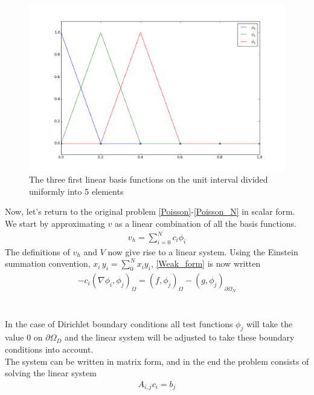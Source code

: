 \begin{figure}
  \begin{center}
    \includegraphics[scale=0.4]{figures/hats.png}
  \end{center}
	\caption{The three first linear basis functions on the unit interval divided uniformly into 5 elements}
	\label{fig:Hats}
\end{figure}
Now, let's return to the original problem \eqref{Poisson}-\eqref{Poisson_N} in scalar form. We start by approximating $v$ as a linear combination of all the basis functions. 
\begin{align}
v_h = \sum_{i=0}^N c_i \phi_i \label{u_hsum}
\end{align}
The definitions of $v_h$ and $V$ now give rise to a linear system. Using the Einstein summation convention, $x_i\,y_i = \sum_0^N x_i y_i $, \eqref{Weak_form} is now written 
\begin{align}
-c_i(\nabla \phi_i, \phi_j)_\Omega = (f,\phi_j)_\Omega - (g, \phi_j)_{\partial \Omega_N} \label{|linear_system}
\end{align}
\\
\\

In the case of Dirichlet boundary conditions all test functions $\phi_j$ will take the value 0 on $\partial \Omega_D$ and the linear system will be adjusted to take these boundary conditions into account. \\
The system can be written in matrix form, and in the end the problem consists of solving the linear system
\begin{align} A_{i,j}c_i = b_j \label{Matrix_1} \end{align}
\\
\\
